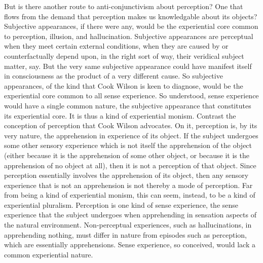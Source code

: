 \documentclass[12pt]{article}
\begin{document}
But is there another route to anti-conjunctivism about perception? One that flows from the demand that perception makes us knowledgable about its objects? Subjective appearances, if there were any, would be the experiential core common to perception, illusion, and hallucination. Subjective appearances are perceptual when they meet certain external conditions, when they are caused by or counterfactually depend upon, in the right sort of way, their veridical subject matter, say. But the very same subjective appearance could have manifest itself in consciousness as the product of a very different cause. So subjective appearances, of the kind that Cook Wilson is keen to diagnose, would be the experiential core common to all sense experience. So understood, sense experience would have a single common nature, the subjective appearance that constitutes its experiential core. It is thus a kind of experiential monism. Contrast the conception of perception that Cook Wilson advocates. On it, perception is, by its very nature, the apprehension in experience of its object. If the subject undergoes some other sensory experience which is not itself the apprehension of the object (either because it is the apprehension of some other object, or because it is the apprehension of no object at all), then it is not a perception of that object. Since perception essentially involves the apprehension of its object, then any sensory experience that is not an apprehension is not thereby a mode of perception. Far from being a kind of experiential monism, this can seem, instead, to be a kind of experiential pluralism. Perception is one kind of sense experience, the sense experience that the subject undergoes when apprehending in sensation aspects of the natural environment. Non-perceptual experiences, such as hallucinations, in apprehending nothing, must differ in nature from episodes such as perception, which are essentially apprehensions. Sense experience, so conceived, would lack a common experiential nature.
\end{document}
